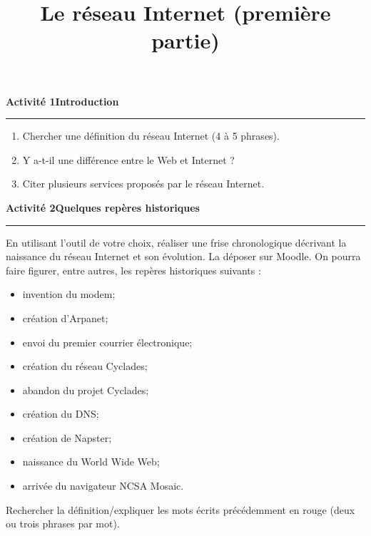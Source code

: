 \documentclass[a4paper]{article}
\begin{document}
\title{Le réseau Internet (première partie)}

\pagestyle{empty}

\date{}
\author{}

\maketitle{}

\thispagestyle{empty}
\noindent\textbf{Activité 1}\hfill{}\textbf{Introduction}
\smallskip
\hrule
\smallskip

\begin{enumerate}
  \item Chercher une définition du réseau Internet (4 à 5 phrases).
  \item Y a-t-il une différence entre le Web et Internet ?
  \item Citer plusieurs services proposés par le réseau Internet.
\end{enumerate}

\bigskip

\noindent\textbf{Activité 2}\hfill{}\textbf{Quelques repères historiques}
\smallskip
\hrule
\medskip

En utilisant l'outil de votre choix, réaliser une frise chronologique décrivant la naissance du réseau Internet et son évolution. La déposer sur Moodle.
On pourra faire figurer, entre autres, les repères historiques suivants :
\begin{itemize}
  \item invention du modem;
  \item création d'{\color{red}Arpanet};
  \item envoi du premier courrier électronique;
  \item création du {\color{red}réseau Cyclades};
  \item abandon du projet Cyclades;
  \item création du {\color{red}DNS};
  \item création de {\color{red}Napster};
  \item naissance du World Wide Web;
  \item arrivée du navigateur {\color{red}NCSA Mosaic}.
\end{itemize}

Rechercher la définition/expliquer les mots écrits précédemment en rouge (deux ou trois phrases par mot).

\bigskip
\end{document}
